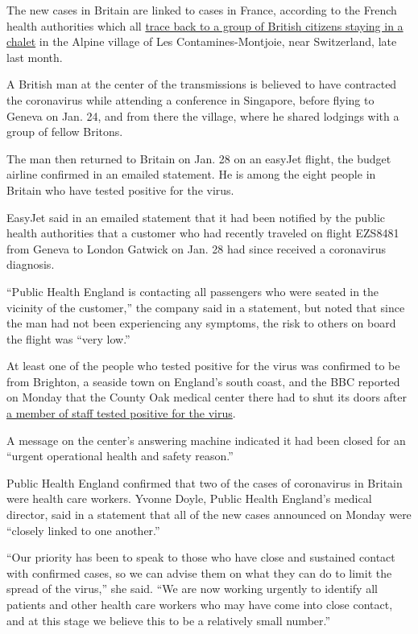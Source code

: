 The new cases in Britain are linked to cases in France, according to the
French health authorities which all
\href{https://www.dailymotion.com/video/x7rnsoh}{trace back to a group
of British citizens staying in a chalet} in the Alpine village of Les
Contamines-Montjoie, near Switzerland, late last month.

A British man at the center of the transmissions is believed to have
contracted the coronavirus while attending a conference in Singapore,
before flying to Geneva on Jan. 24, and from there the village, where he
shared lodgings with a group of fellow Britons.

The man then returned to Britain on Jan. 28 on an easyJet flight, the
budget airline confirmed in an emailed statement. He is among the eight
people in Britain who have tested positive for the virus.

EasyJet said in an emailed statement that it had been notified by the
public health authorities that a customer who had recently traveled on
flight EZS8481 from Geneva to London Gatwick on Jan. 28 had since
received a coronavirus diagnosis.

``Public Health England is contacting all passengers who were seated in
the vicinity of the customer,'' the company said in a statement, but
noted that since the man had not been experiencing any symptoms, the
risk to others on board the flight was ``very low.''

At least one of the people who tested positive for the virus was
confirmed to be from Brighton, a seaside town on England's south coast,
and the BBC reported on Monday that the County Oak medical center there
had to shut its doors after
\href{https://www.bbc.co.uk/news/uk-51447761}{a member of staff tested
positive for the virus}.

A message on the center's answering machine indicated it had been closed
for an ``urgent operational health and safety reason.''

Public Health England confirmed that two of the cases of coronavirus in
Britain were health care workers. Yvonne Doyle, Public Health England's
medical director, said in a statement that all of the new cases
announced on Monday were ``closely linked to one another.''

``Our priority has been to speak to those who have close and sustained
contact with confirmed cases, so we can advise them on what they can do
to limit the spread of the virus,'' she said. ``We are now working
urgently to identify all patients and other health care workers who may
have come into close contact, and at this stage we believe this to be a
relatively small number.''

